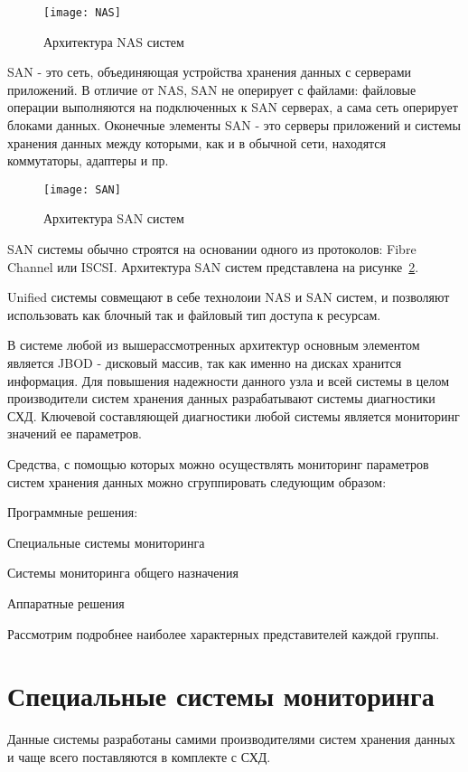 \begin{figure}[!h]
	\centering
	\texttt{[image: NAS]}
	\caption{Архитектура NAS систем}
	\label{fig:NAS}
\end{figure}
  
SAN - это сеть, объединяющая устройства хранения данных с серверами приложений. В отличие от NAS, SAN не оперирует с файлами: файловые операции выполняются на подключенных к SAN серверах, а сама сеть оперирует блоками данных. Оконечные элементы SAN - это серверы приложений и системы хранения данных между которыми, как и в обычной сети, находятся коммутаторы, адаптеры и пр.

\begin{figure}[!h]
	\centering
	\texttt{[image: SAN]}
	\caption{Архитектура SAN систем}
	\label{fig:SAN}
\end{figure}

SAN системы обычно строятся на основании одного из протоколов: Fibre Channel или ISCSI. Архитектура SAN систем представлена на рисунке~\ref{fig:SAN}.

Unified системы совмещают в себе технолоии NAS и SAN систем, и позволяют использовать как блочный так и файловый тип доступа к ресурсам. 

В системе любой из вышерассмотренных архитектур основным элементом является JBOD - дисковый массив, так как именно на дисках хранится информация. Для повышения надежности данного узла и всей системы в целом производители систем хранения данных разрабатывают системы диагностики СХД. Ключевой составляющей диагностики любой системы является мониторинг значений ее параметров. 

Средства, с помощью которых можно осуществлять мониторинг параметров систем хранения данных можно сгруппировать следующим образом:
\begin{itemize*}
	\item{Программные решения:}
	\begin{itemize*}
		\item{Специальные системы мониторинга}
		\item{Системы мониторинга общего назначения}
	\end{itemize*}
	\item{Аппаратные решения}
\end{itemize*}

Рассмотрим подробнее наиболее характерных представителей каждой группы.
 
\section{Специальные системы мониторинга}
Данные системы разработаны самими  производителями систем хранения данных и чаще всего поставляются в комплекте с СХД.

